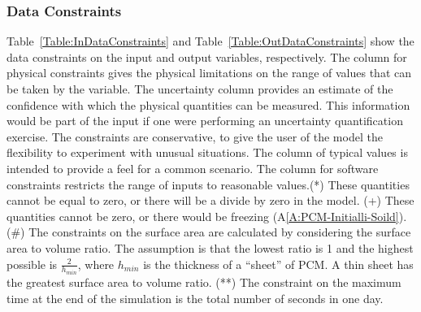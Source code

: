 \documentclass[12pt]{article}
\begin{document}
\subsubsection{Data Constraints}
\label{Sec:DataConstraints}
Table~\ref{Table:InDataConstraints} and Table~\ref{Table:OutDataConstraints} show the data constraints on the input and output variables, respectively. The column for physical constraints gives the physical limitations on the range of values that can be taken by the variable. The uncertainty column provides an estimate of the confidence with which the physical quantities can be measured. This information would be part of the input if one were performing an uncertainty quantification exercise. The constraints are conservative, to give the user of the model the flexibility to experiment with unusual situations. The column of typical values is intended to provide a feel for a common scenario. The column for software constraints restricts the range of inputs to reasonable values.(*) These quantities cannot be equal to zero, or there will be a divide by zero in the model. (+) These quantities cannot be zero, or there would be freezing (A\ref{A:PCM-Initialli-Soild}). (\#) The constraints on the surface area are calculated by considering the surface area to volume ratio. The assumption is that the lowest ratio is 1 and the highest possible is $\frac{2}{{h_{min}}}$, where ${h_{min}}$ is the thickness of a ``sheet'' of PCM. A thin sheet has the greatest surface area to volume ratio. (**) The constraint on the maximum time at the end of the simulation is the total number of seconds in one day.
\end{document}
